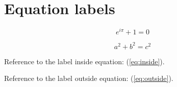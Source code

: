 \documentclass{article}
\begin{document}
\setcounter{section}{4}
\section{Equation labels}

\begin{equation}
    e^{i\pi}+1=0
    \label{eq:inside}
\end{equation}

\begin{equation}
    a^2+b^2=c^2
\end{equation}
\label{eq:outside}

Reference to the label inside equation:
(\ref{eq:inside}).

Reference to the label outside equation:
(\ref{eq:outside}).
\end{document}
